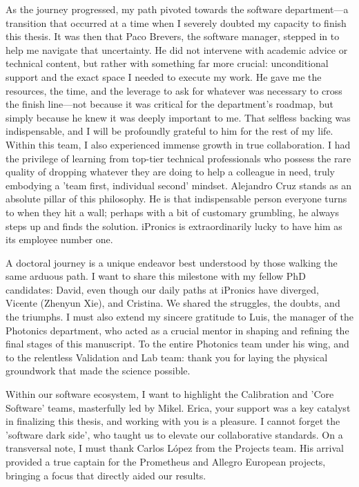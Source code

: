 As the journey progressed, my path pivoted towards the software department—a transition that 
occurred at a time when I severely doubted my capacity to finish this thesis. It was then that Paco 
Brevers, the software manager, stepped in to help me navigate that uncertainty. He did not 
intervene with academic advice or technical content, but rather with something far more crucial: 
unconditional support and the exact space I needed to execute my work. He gave me the resources, 
the time, and the leverage to ask for whatever was necessary to cross the finish line—not because 
it was critical for the department's roadmap, but simply because he knew it was deeply important to 
me. That selfless backing was indispensable, and I will be profoundly grateful to him for the rest 
of my life. Within this team, I also experienced immense growth in true collaboration. I had the 
privilege of learning from top-tier technical professionals who possess the rare quality of 
dropping whatever they are doing to help a colleague in need, truly embodying a 'team first, 
individual second' mindset. Alejandro Cruz stands as an absolute pillar of this philosophy. He is 
that indispensable person everyone turns to when they hit a wall; perhaps with a bit of customary 
grumbling, he always steps up and finds the solution. iPronics is extraordinarily lucky to have him 
as its employee number one.

A doctoral journey is a unique endeavor best understood by those walking the same arduous path. I 
want to share this milestone with my fellow PhD candidates: David, even though our daily paths at 
iPronics have diverged, Vicente (Zhenyun Xie), and Cristina. We shared the struggles, the doubts, 
and the triumphs. I must also extend my sincere gratitude to Luis, the manager of the Photonics 
department, who acted as a crucial mentor in shaping and refining the final stages of this 
manuscript. To the entire Photonics team under his wing, and to the relentless Validation and Lab 
team: thank you for laying the physical groundwork that made the science possible. 

Within our software ecosystem, I want to highlight the Calibration and 'Core Software' teams, 
masterfully led by Mikel. Erica, your support was a key catalyst in finalizing this thesis, and 
working with you is a pleasure. I cannot forget the 'software dark side', who taught us to elevate 
our collaborative standards. On a transversal note, I must thank Carlos López from the Projects 
team. His arrival provided a true captain for the Prometheus and Allegro European projects, 
bringing a focus that directly aided our results.


